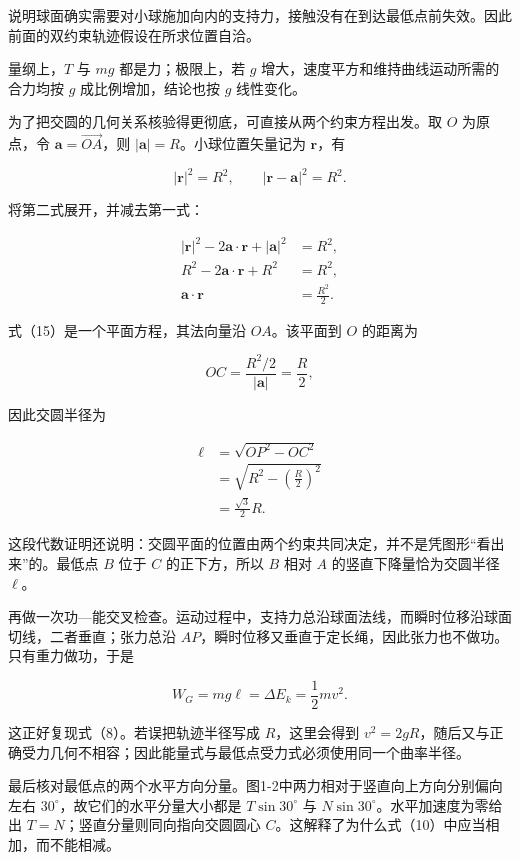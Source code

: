 \documentclass[12pt,a4paper,UTF8]{ctexart}
\begin{document}
说明球面确实需要对小球施加向内的支持力，接触没有在到达最低点前失效。因此前面的双约束轨迹假设在所求位置自洽。

量纲上，\(T\) 与 \(mg\) 都是力；极限上，若 \(g\)
增大，速度平方和维持曲线运动所需的合力均按 \(g\) 成比例增加，结论也按
\(g\) 线性变化。

为了把交圆的几何关系核验得更彻底，可直接从两个约束方程出发。取 \(O\)
为原点，令 \(\boldsymbol a=\overrightarrow{OA}\)，则
\(|\boldsymbol a|=R\)。小球位置矢量记为 \(\boldsymbol r\)，有

\[
|\boldsymbol r|^2=R^2,
\qquad
|\boldsymbol r-\boldsymbol a|^2=R^2. \tag{14}
\]

将第二式展开，并减去第一式：

\[
\begin{aligned}
|\boldsymbol r|^2-2\boldsymbol a\cdot\boldsymbol r+|\boldsymbol a|^2
&=R^2,\\
R^2-2\boldsymbol a\cdot\boldsymbol r+R^2
&=R^2,\\
\boldsymbol a\cdot\boldsymbol r&=\frac{R^2}{2}. 
\end{aligned} \tag{15}
\]

式（15）是一个平面方程，其法向量沿 \(OA\)。该平面到 \(O\) 的距离为

\[
OC=\frac{R^2/2}{|\boldsymbol a|}=\frac R2, \tag{16}
\]

因此交圆半径为

\[
\begin{aligned}
\ell
&=\sqrt{OP^2-OC^2}\\
&=\sqrt{R^2-\left(\frac R2\right)^2}\\
&=\frac{\sqrt3}{2}R.
\end{aligned} \tag{17}
\]

这段代数证明还说明：交圆平面的位置由两个约束共同决定，并不是凭图形``看出来''的。最低点
\(B\) 位于 \(C\) 的正下方，所以 \(B\) 相对 \(A\)
的竖直下降量恰为交圆半径 \(\ell\)。

再做一次功---能交叉检查。运动过程中，支持力总沿球面法线，而瞬时位移沿球面切线，二者垂直；张力总沿
\(AP\)，瞬时位移又垂直于定长绳，因此张力也不做功。只有重力做功，于是

\[
W_G=mg\ell=\Delta E_k=\frac12mv^2. \tag{18}
\]

这正好复现式（8）。若误把轨迹半径写成 \(R\)，这里会得到
\(v^2=2gR\)，随后又与正确受力几何不相容；因此能量式与最低点受力式必须使用同一个曲率半径。

最后核对最低点的两个水平方向分量。图1-2中两力相对于竖直向上方向分别偏向左右
\(30^\circ\)，故它们的水平分量大小都是 \(T\sin30^\circ\) 与
\(N\sin30^\circ\)。水平加速度为零给出
\(T=N\)；竖直分量则同向指向交圆圆心
\(C\)。这解释了为什么式（10）中应当相加，而不能相减。
\end{document}
